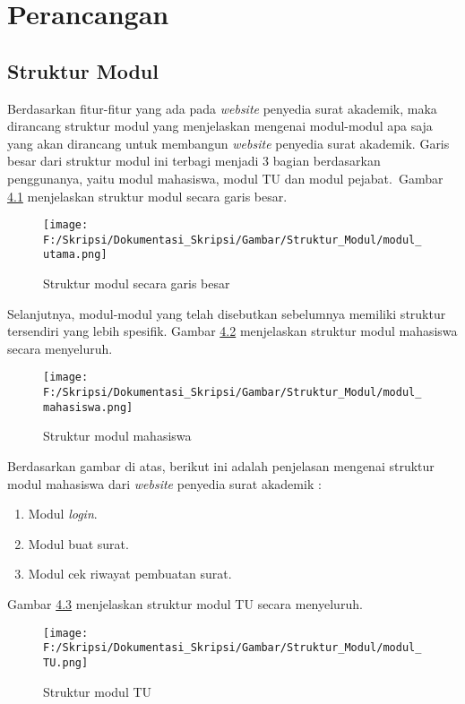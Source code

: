 \chapter{Perancangan}
\label{chap:perancangan}

\section{Struktur Modul}
\label{sec:struktur_modul}
Berdasarkan fitur-fitur yang ada pada \textit{website} penyedia surat akademik, maka dirancang struktur modul yang menjelaskan mengenai modul-modul apa saja yang akan dirancang untuk membangun \textit{website} penyedia surat akademik. Garis besar dari struktur modul ini terbagi menjadi 3 bagian berdasarkan penggunanya, yaitu modul mahasiswa, modul TU dan modul pejabat.\
Gambar \hyperlink{struktur_modul_garis_besar}{4.1} menjelaskan struktur modul secara garis besar.

\begin{figure}[H]
	\centering
		\texttt{[image: F:/Skripsi/Dokumentasi\_Skripsi/Gambar/Struktur\_Modul/modul\_utama.png]}
	\caption{Struktur modul secara garis besar}
	\label{fig:struktur_modul_garis_besar}
\end{figure}

Selanjutnya, modul-modul yang telah disebutkan sebelumnya memiliki struktur tersendiri yang lebih spesifik. Gambar \hyperlink{struktur_modul_mahasiswa}{4.2} menjelaskan struktur modul mahasiswa secara menyeluruh.

\begin{figure}[H]
	\centering
		\texttt{[image: F:/Skripsi/Dokumentasi\_Skripsi/Gambar/Struktur\_Modul/modul\_mahasiswa.png]}
	\caption{Struktur modul mahasiswa}
	\label{fig:struktur_modul_mahasiswa}
\end{figure}

Berdasarkan gambar di atas, berikut ini adalah penjelasan mengenai struktur modul mahasiswa dari \textit{\textit{website}} penyedia surat akademik :
\begin{enumerate}
	\item Modul \textit{login}.
	\item Modul buat surat.
	\item Modul cek riwayat pembuatan surat.
\end{enumerate}

Gambar \hyperlink{struktur_modul_tu}{4.3} menjelaskan struktur modul TU secara menyeluruh.

\begin{figure}[H]
	\centering
		\texttt{[image: F:/Skripsi/Dokumentasi\_Skripsi/Gambar/Struktur\_Modul/modul\_TU.png]}
	\caption{Struktur modul TU}
	\label{fig:struktur_modul_TU}
\end{figure}

